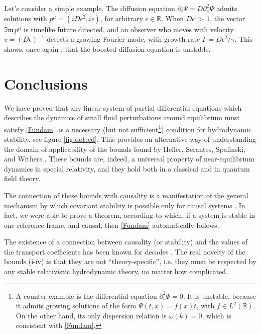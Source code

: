 \documentclass[a4paper, amsfonts, amssymb, amsmath, reprint, showkeys, nofootinbib, twoside,notitlepage]{revtex4-1}
\theoremstyle{definition}
\theoremstyle{theorem}
\theoremstyle{corollary}
\begin{document}
Let's consider a simple example. The diffusion equation $\partial_t \Psi=D \partial^2_x \Psi$ admits solutions with $p^\mu{=}(iD\epsilon^2,i\epsilon)$, for arbitrary $\epsilon \in \mathbb{R}$. When $D\epsilon \,{>} \,1$, the vector $\mathfrak{Im}\, p^\mu$ is timelike future directed, and an observer who moves with velocity $v=(D\epsilon)^{-1}$ detects a growing Fourier mode, with growth rate $\Gamma= D\epsilon^2/\gamma$. This shows, once again \cite{Kost2000,GavassinoLyapunov_2020,
GavassinoFronntiers2021}, that the boosted diffusion equation is unstable. 





\section{Conclusions}

We have proved that any linear system of partial differential equations which describes the dynamics of small fluid perturbations around equilibrium must satisfy \eqref{Fundam} as a necessary (but not sufficient\footnote{A counter-example is the differential equation $\partial^2_t \Psi=0$. It is unstable, because it admits growing solutions of the form $\Psi(t,x)=f(x)t$, with $f \in L^2(\mathbb{R})$. On the other hand, its only dispersion relation is $\omega(k)=0$, which is consistent with \eqref{Fundam}.}) condition for hydrodynamic stability, see figure \ref{fig:dotted}. This provides an alternative way of understanding the domain of applicability of the bounds found by Heller, Serantes, Spalinski, and Withers \cite{Heller2022}. These bounds are, indeed, a universal property of near-equilibrium dynamics in special relativity, and they hold both in a classical and in quantum field theory.

The connection of these bounds with causality is a manifestation of the general mechanism by which covariant stability is possible only for causal systems \cite{GavassinoSuperluminal2021}. In fact, we were able to prove a theorem, according to which, if a system is stable in one reference frame, and causal, then \eqref{Fundam} automatically follows.

The existence of a connection between causality (or stability) and the values of the transport coefficients has been known for decades \cite{Hishcock1983,OlsonLifsh1990,DenicolKodama,Romatschke2010,Pu2010,
BemficaDNDefinitivo2020,
GavassinoStabilityCarter2022}. The real novelty of the bounds (i-iv) is that they are not ``theory-specific'', i.e. they must be respected by any stable relativistic hydrodynamic theory, no matter how complicated.
\end{document}
